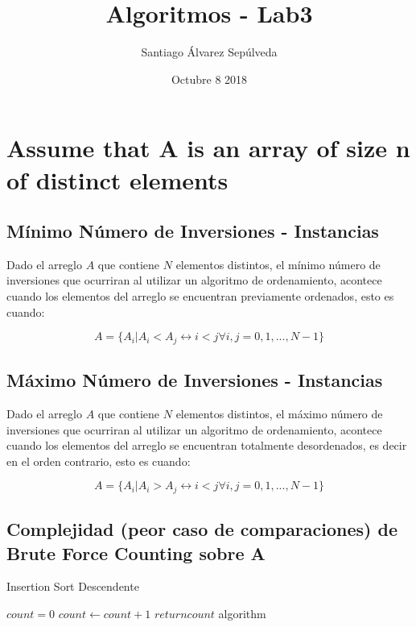 \documentclass{article}
\title{Algoritmos - Lab3}
\author{Santiago Álvarez Sepúlveda }
\date{Octubre 8 2018}
\begin{document}
\maketitle

\section{Assume that A is an array of size  n of  distinct elements}

\subsection{Mínimo Número de Inversiones - Instancias}
Dado el arreglo $A$ que contiene $N$ elementos distintos, el mínimo número de inversiones que ocurriran al utilizar un algoritmo de ordenamiento, acontece cuando los elementos del arreglo se encuentran previamente ordenados, esto es cuando:

\begin{equation}
    A = \{A_i | A_i < A_j \leftrightarrow i < j \forall i, j = 0, 1, ..., N-1\}
\end{equation}

\subsection{Máximo Número de Inversiones - Instancias}
Dado el arreglo $A$ que contiene $N$ elementos distintos, el máximo número de inversiones que ocurriran al utilizar un algoritmo de ordenamiento, acontece cuando los elementos del arreglo se encuentran totalmente  desordenados, es decir en el orden contrario, esto es cuando:

\begin{equation}
    A = \{A_i | A_i > A_j \leftrightarrow i < j \forall i, j = 0, 1, ..., N-1\}
\end{equation}


\subsection{Complejidad (peor caso de comparaciones) de Brute Force Counting sobre A}

\begin{algorithm}[H]
    \caption{Insertion Sort Descendente}\label{alg:isort_desc}
    \begin{algorithmic}[1]
            \State $count = 0$
                        \State $count \gets count + 1$
                    \EndIf
                \EndFor\label{isort_for}
            \EndFor\label{isort_for}
            \State $return count$ 
        \EndProcedurelatex algorithm 
    \end{algorithmic}
\end{algorithm}
\end{document}
